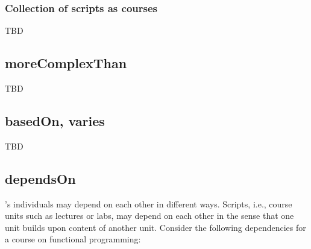 


\subsubsection{Collection of scripts as courses}

TBD


\subsection{moreComplexThan}
\label{S:moreComplexThan}

TBD

\begin{comment}
Aha, moreComplexThan!?
- A contribution being more complex than another contribution
- A feature being more complex than another feature
- Does this sound like something applicable to language subset relationship?
\end{comment}


\subsection{basedOn, varies}
\label{S:basedOn}
\label{S:varies}

TBD

\begin{comment}
Contributions based on other contributions
Contributions varying other contributions
\end{comment}


\subsection{dependsOn}
\label{S:dependsOn}

\solasote{}'s individuals may depend on each other in different
ways. Scripts, i.e., course units such as lectures or labs, may depend
on each other in the sense that one unit builds upon content of
another unit. Consider the following dependencies for a course on
functional programming:

